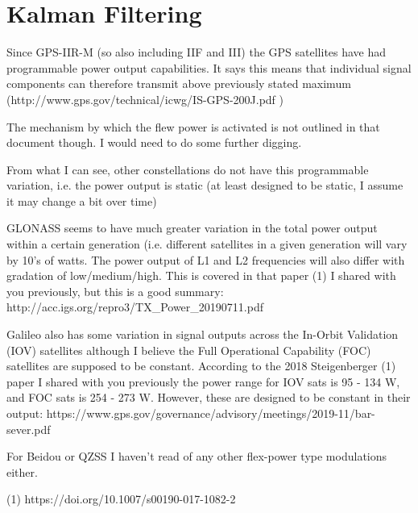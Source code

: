 \chapter{Kalman Filtering}
\label{ch:kalman_filter}
%
Since GPS-IIR-M (so also including IIF and III) the GPS satellites have had programmable power output capabilities. It says this means that individual signal components can therefore transmit above previously stated maximum (http://www.gps.gov/technical/icwg/IS-GPS-200J.pdf )

The mechanism by which the flew power is activated is not outlined in that document though. I would need to do some further digging.

From what I can see, other constellations do not have this programmable variation, i.e. the power output is static (at least designed to be static, I assume it may change a bit over time)

GLONASS seems to have much greater variation in the total power output within a certain generation (i.e. different satellites in a given generation will vary by 10’s of watts. The power output of L1 and L2 frequencies will also differ with gradation of low/medium/high. This is covered in that paper (1) I shared with you previously, but this is a good summary: http://acc.igs.org/repro3/TX\_Power\_20190711.pdf

Galileo also has some variation in signal outputs across the In-Orbit Validation (IOV) satellites although I believe the Full Operational Capability (FOC) satellites are supposed to be constant. According to the 2018 Steigenberger (1) paper I shared with you previously the power range for IOV sats is 95 - 134 W, and FOC sats is 254 - 273 W. However, these are designed to be constant in their output: https://www.gps.gov/governance/advisory/meetings/2019-11/bar-sever.pdf

For Beidou or QZSS I haven’t read of any other flex-power type modulations either.

(1) https://doi.org/10.1007/s00190-017-1082-2